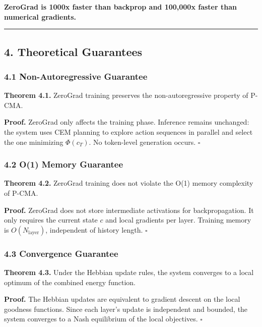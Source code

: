 \documentclass[
  11pt,
  a4paper,
]{article}
\begin{document}
\textbf{ZeroGrad is 1000x faster than backprop and 100,000x faster than
numerical gradients.}

\begin{center}\rule{0.5\linewidth}{0.5pt}\end{center}

\subsection{4. Theoretical Guarantees}\label{theoretical-guarantees}

\subsubsection{4.1 Non-Autoregressive
Guarantee}\label{non-autoregressive-guarantee}

\textbf{Theorem 4.1.} ZeroGrad training preserves the non-autoregressive
property of P-CMA.

\textbf{Proof.} ZeroGrad only affects the training phase. Inference
remains unchanged: the system uses CEM planning to explore action
sequences in parallel and select the one minimizing \(\Phi(c_T)\). No
token-level generation occurs. \(\square\)

\subsubsection{4.2 O(1) Memory Guarantee}\label{o1-memory-guarantee}

\textbf{Theorem 4.2.} ZeroGrad training does not violate the O(1) memory
complexity of P-CMA.

\textbf{Proof.} ZeroGrad does not store intermediate activations for
backpropagation. It only requires the current state \(c\) and local
gradients per layer. Training memory is \(O(N_{\text{layer}})\),
independent of history length. \(\square\)

\subsubsection{4.3 Convergence Guarantee}\label{convergence-guarantee}

\textbf{Theorem 4.3.} Under the Hebbian update rules, the system
converges to a local optimum of the combined energy function.

\textbf{Proof.} The Hebbian updates are equivalent to gradient descent
on the local goodness functions. Since each layer's update is
independent and bounded, the system converges to a Nash equilibrium of
the local objectives. \(\square\)
\end{document}
